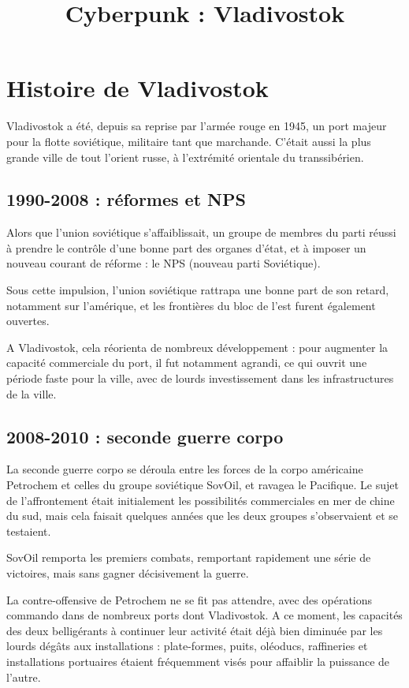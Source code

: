\documentclass[10pt,a4paper]{book}
\title{Cyberpunk : Vladivostok}
\begin{document}
\maketitle
\tableofcontents

\chapter{Histoire de Vladivostok}
Vladivostok a été, depuis sa reprise par l'armée rouge en 1945, un port majeur pour la flotte soviétique, militaire tant que marchande. C'était aussi la plus grande ville de tout l'orient russe, à l'extrémité orientale du transsibérien.

\section{1990-2008 : réformes et NPS}
Alors que l'union soviétique s'affaiblissait, un groupe de membres du parti réussi à prendre le contrôle d'une bonne part des organes d'état, et à imposer un nouveau courant de réforme : le NPS (nouveau parti Soviétique). 

Sous cette impulsion, l'union soviétique rattrapa une bonne part de son retard, notamment sur l'amérique, et les frontières du bloc de l'est furent également ouvertes.

A Vladivostok, cela réorienta de nombreux développement : pour augmenter la capacité commerciale du port, il fut notamment agrandi, ce qui ouvrit une période faste pour la ville, avec de lourds investissement dans les infrastructures de la ville.
\section{2008-2010 : seconde guerre corpo}
La seconde guerre corpo se déroula entre les forces de la corpo américaine Petrochem et celles du groupe soviétique SovOil, et ravagea le Pacifique. Le sujet de l'affrontement était initialement les possibilités commerciales en mer de chine du sud, mais cela faisait quelques années que les deux groupes s'observaient et se testaient.

SovOil remporta les premiers combats, remportant rapidement une série de victoires, mais sans gagner décisivement la guerre.

La contre-offensive de Petrochem ne se fit pas attendre, avec des opérations commando dans de nombreux ports dont Vladivostok. A ce moment, les capacités des deux belligérants à continuer leur activité était déjà bien diminuée par les lourds dégâts aux installations : plate-formes, puits, oléoducs, raffineries et installations portuaires étaient fréquemment visés pour affaiblir la puissance de l'autre.
\end{document}
